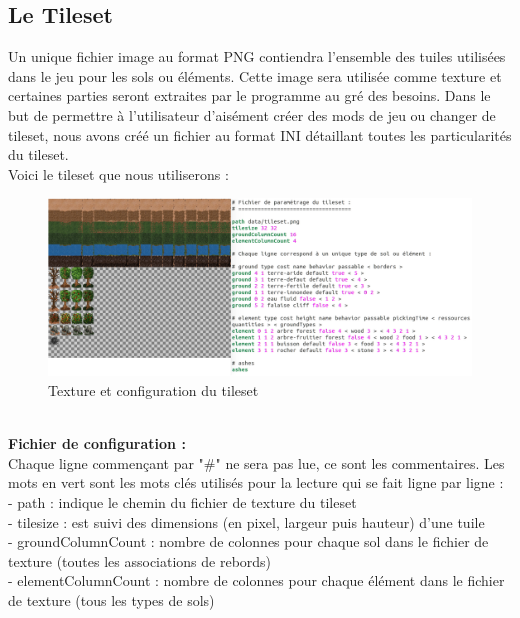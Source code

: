 \documentclass[a4paper]{article}
\newcommand{\alinea}{\hspace*{0.5cm}}
\begin{document}
      \subsection{Le Tileset}
		\label{TilesetDev}
		\alinea Un unique fichier image au format PNG contiendra l'ensemble des tuiles utilisées dans le jeu pour les sols ou éléments. Cette image sera utilisée comme texture et certaines parties seront extraites par le programme au gré des besoins.
		\alinea Dans le but de permettre à l'utilisateur d'aisément créer des mods de jeu ou changer de tileset, nous avons créé un fichier au format INI détaillant toutes les particularités du tileset.\\
		\alinea Voici le tileset que nous utiliserons :\\
        \begin{figure}
          \begin{center}
            \includegraphics[scale=0.35]{img/TilesetPngIni.png}
          \end{center}
          \label{TilesetPngIni}
          \caption{Texture et configuration du tileset}
        \end{figure}
        \\
        \textbf{Fichier de configuration :}\\
        \alinea Chaque ligne commençant par "\#" ne sera pas lue, ce sont les commentaires. Les mots en vert sont les mots clés utilisés pour la lecture qui se fait ligne par ligne :\\
        - path : indique le chemin du fichier de texture du tileset\\
        - tilesize : est suivi des dimensions (en pixel, largeur puis hauteur) d'une tuile\\
        - groundColumnCount : nombre de colonnes pour chaque sol dans le fichier de texture (toutes les associations de rebords)\\
        - elementColumnCount : nombre de colonnes pour chaque élément dans le fichier de texture (tous les types de sols)\\
\end{document}
